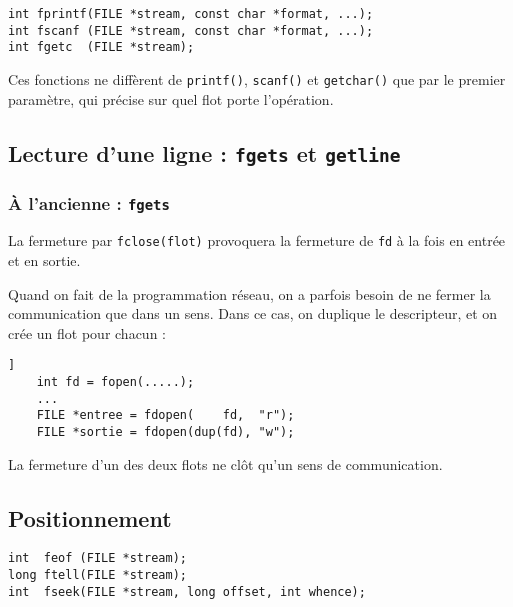 \extrait
\begin{lstlisting}
int fprintf(FILE *stream, const char *format, ...);
int fscanf (FILE *stream, const char *format, ...);
int fgetc  (FILE *stream);
\end{lstlisting}

Ces fonctions ne diffèrent de \texttt{printf()},
\texttt{scanf()} et \texttt{getchar()} que par le premier paramètre,
qui précise sur quel flot porte l'opération.


\subsection{Lecture d'une ligne : \texttt{fgets} et \texttt{getline}}


\subsubsection{À l'ancienne : \texttt{fgets}}

La fermeture par \texttt{fclose(flot)} provoquera la fermeture de \texttt{fd}
à la fois en entrée et en sortie.

Quand on fait de la programmation réseau, on a parfois besoin de ne
fermer la communication que dans un sens. Dans ce cas, on duplique le
descripteur, et on crée un flot pour chacun :

\extrait
\begin{lstlisting}]
    int fd = fopen(.....);
    ...
    FILE *entree = fdopen(    fd,  "r");
    FILE *sortie = fdopen(dup(fd), "w");
\end{lstlisting}

La fermeture d'un des deux flots ne clôt qu'un sens de communication.



\subsection{Positionnement}


\extrait
\begin{lstlisting}
int  feof (FILE *stream);
long ftell(FILE *stream);
int  fseek(FILE *stream, long offset, int whence);
\end{lstlisting}

